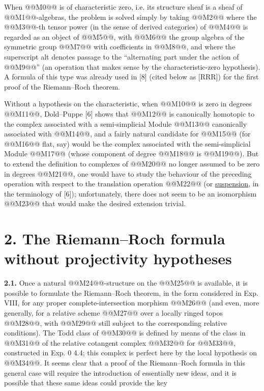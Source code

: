 When @@M0@@ is of characteristic zero, i.e. its structure sheaf is a sheaf of @@M1@@-algebras, the problem is solved simply by taking
@@M2@@
where the @@M3@@-th tensor power (in the sense of derived categories) of @@M4@@ is regarded as an object of @@M5@@, with @@M6@@ the group algebra of the symmetric group @@M7@@ with coefficients in @@M8@@, and where the superscript alt denotes passage to the ``alternating part under the action of @@M9@@'' (an operation that makes sense by the characteristic-zero hypothesis). A formula of this type was already used in [8] (cited below as [RRR]) for the first proof of the Riemann--Roch theorem.

Without a hypothesis on the characteristic, when @@M10@@ is zero in degrees @@M11@@, Dold--Puppe [6] shows that @@M12@@ is canonically homotopic to the complex associated with a semi-simplicial Module @@M13@@ canonically associated with @@M14@@, and a fairly natural candidate for @@M15@@ (for @@M16@@ flat, say) would be the complex associated with the semi-simplicial Module @@M17@@ (whose component of degree @@M18@@ is @@M19@@). But to extend the definition to complexes of @@M20@@ no longer assumed to be zero in degrees @@M21@@, one would have to study the behaviour of the preceding operation with respect to the translation operation @@M22@@ (or \uline{suspension}, in the terminology of [6]); unfortunately, there does not seem to be an isomorphism @@M23@@ that would make the desired extension trivial.

\section*{2. The Riemann--Roch formula without projectivity hypotheses}

\textbf{2.1.} Once a natural @@M24@@-structure on the @@M25@@ is available, it is possible to formulate the Riemann--Roch theorem, in the form considered in Exp. VIII, for any proper complete-intersection morphism @@M26@@ (and even, more generally, for a relative scheme @@M27@@ over a locally ringed topos @@M28@@, with @@M29@@ still subject to the corresponding relative conditions). The Todd class of @@M30@@ is defined by means of the class in @@M31@@ of the relative cotangent complex @@M32@@ for @@M33@@, constructed in Exp. 0 4.4; this complex is perfect here by the local hypothesis on @@M34@@. It seems clear that a proof of the Riemann--Roch formula in this general case will require the introduction of essentially new ideas, and it is possible that these same ideas could provide the key
